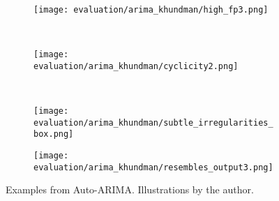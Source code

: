 \begin{figure}[htp!]
    \begin{subfigure}[b]{\linewidth}
        \centering
        \texttt{[image: evaluation/arima\_khundman/high\_fp3.png]}
        \label{fig:arima-fp}
    \end{subfigure}%
    \\
    \begin{subfigure}[b]{\linewidth}
        \centering
        \texttt{[image: evaluation/arima\_khundman/cyclicity2.png]}
        \label{fig:arima-cyclicity}
    \end{subfigure}
    \\
    \begin{subfigure}[b]{\linewidth}
        \centering
        \texttt{[image: evaluation/arima\_khundman/subtle\_irregularities\_box.png]}
        \label{fig:arima-subtle}
    \end{subfigure}
\end{figure}
\begin{figure}[htp!]
    \ContinuedFloat{}
    \begin{subfigure}[b]{\linewidth}
        \centering
        \texttt{[image: evaluation/arima\_khundman/resembles\_output3.png]}
        \label{fig:arima-resembles}
    \end{subfigure}
    \caption[Examples from Auto-ARIMA.]{Examples from Auto-ARIMA\@. Illustrations by the author.}\label{fig:arima-output}
\end{figure}

